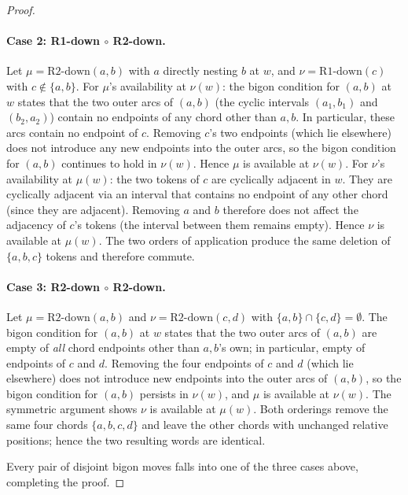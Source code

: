 \begin{proof}
\paragraph{Case 2: R1-down $\circ$ R2-down.}
Let $\mu = \text{R2-down}(a, b)$ with $a$ directly nesting $b$ at $w$,
and $\nu = \text{R1-down}(c)$ with $c \notin \{a, b\}$.
For $\mu$'s availability at $\nu(w)$: the bigon condition for $(a, b)$
at $w$ states that the two outer arcs of $(a, b)$ (the cyclic intervals
$(a_1, b_1)$ and $(b_2, a_2)$) contain no endpoints of any chord other
than $a, b$. In particular, these arcs contain no endpoint of $c$.
Removing $c$'s two endpoints (which lie elsewhere) does not introduce
any new endpoints into the outer arcs, so the bigon condition for
$(a, b)$ continues to hold in $\nu(w)$. Hence $\mu$ is available at
$\nu(w)$.
For $\nu$'s availability at $\mu(w)$: the two tokens of $c$ are
cyclically adjacent in $w$. They are cyclically adjacent via an
interval that contains no endpoint of any other chord (since they are
adjacent). Removing $a$ and $b$ therefore does not affect the
adjacency of $c$'s tokens (the interval between them remains empty).
Hence $\nu$ is available at $\mu(w)$.
The two orders of application produce the same deletion of
$\{a, b, c\}$ tokens and therefore commute.

\paragraph{Case 3: R2-down $\circ$ R2-down.}
Let $\mu = \text{R2-down}(a, b)$ and $\nu = \text{R2-down}(c, d)$ with
$\{a, b\} \cap \{c, d\} = \emptyset$.
The bigon condition for $(a, b)$ at $w$ states that the two outer
arcs of $(a, b)$ are empty of \emph{all} chord endpoints other than
$a, b$'s own; in particular, empty of endpoints of $c$ and $d$.
Removing the four endpoints of $c$ and $d$ (which lie elsewhere) does
not introduce new endpoints into the outer arcs of $(a, b)$, so the
bigon condition for $(a, b)$ persists in $\nu(w)$, and $\mu$ is
available at $\nu(w)$. The symmetric argument shows $\nu$ is available
at $\mu(w)$. Both orderings remove the same four chords $\{a, b, c, d\}$
and leave the other chords with unchanged relative positions; hence the
two resulting words are identical.

Every pair of disjoint bigon moves falls into one of the three cases
above, completing the proof.
\end{proof}
